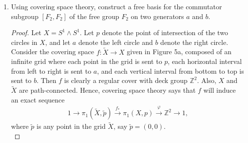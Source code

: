 \documentclass{article}
\begin{document}
\begin{enumerate}[label={\bf Q\arabic*:}]
    \begin{proof}
      Assume by contradiction that $f$ is not finite-sheeted. Define an
      open cover $\mathcal{O}$ of $\widetilde{X}$ by the set of all sheets
      lying above each point $x$ in $X$, i.e.
      \begin{equation*}
        \mathcal{O} := \bigcup_{x\in X}
          \{\widetilde{U}_{\alpha,x}:\alpha\in A\}.
      \end{equation*}
      From compactness of $\widetilde{X}$, $\mathcal{O}$ contains a finite
      sub-cover $\mathcal{U}\subset\mathcal{O}$. Write $\mathcal{U}$ as
      \begin{equation*}
        \mathcal{U} := \bigcup_{i=1}^n \widetilde{U}_{\alpha_i,x_i}.
      \end{equation*}
      Consider the sheets of $x_1$. Each sheet $\widetilde{U}_{\alpha,x_1}$
      of $x_1$ must be contained in some sheet in $\mathcal{U}$, which
      implies that the degree of $x_1$ is at most $n$. Since the degree of
      a cover is independent on the choice of $x\in X$, $f$ must have
      degree no more than $n$, a contradiction.
    \end{proof}

  \item Using covering space theory, construct a free basis for the
    commutator subgroup $[F_2,F_2]$ of the free group $F_2$ on two
    generators $a$ and $b$.

    \begin{proof}
      Let $X=S^1\wedge S^1$. Let $p$ denote the point of intersection of
      the two circles in $X$, and let $a$ denote the left circle and $b$
      denote the right circle. Consider the covering space
      $f:\widetilde{X}\rightarrow X$ given in Figure 5a, composed of an
      infinite grid where each point in the grid is sent to $p$, each
      horizontal interval from left to right is sent to $a$, and each
      vertical interval from bottom to top is sent to $b$. Then $f$ is
      clearly a regular cover with deck group $\mathbb{Z}^2$. Also, $X$ and
      $\widetilde{X}$ are path-connected. Hence, covering space theory says
      that $f$ will induce an exact sequence
      \begin{align*}
        1\rightarrow \pi_1(\widetilde{X},\widetilde{p})\xrightarrow{f_*}
          \pi_1(X,p)\xrightarrow{\varphi} \mathbb{Z}^2\rightarrow 1,
      \end{align*}
      where $\widetilde{p}$ is any point in the grid $\widetilde{X}$, say
      $\widetilde{p}=(0,0)$. \\


\end{proof}
\end{enumerate}
\end{document}
